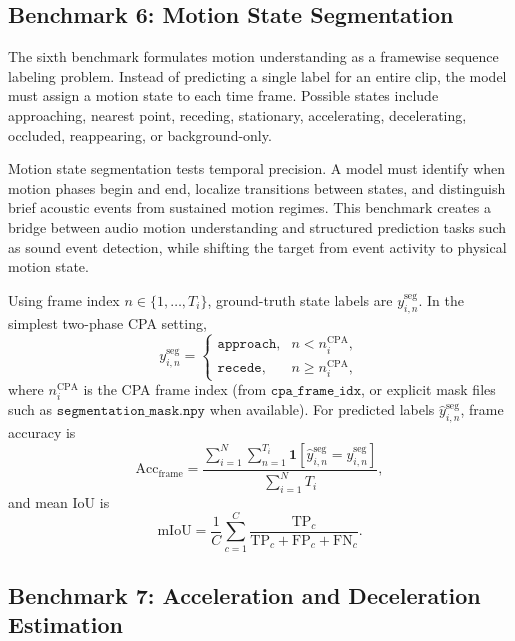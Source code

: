 \documentclass{article}
\begin{document}
\subsection{Benchmark 6: Motion State Segmentation}

The sixth benchmark formulates motion understanding as a framewise sequence labeling problem. Instead of predicting a single label for an entire clip, the model must assign a motion state to each time frame. Possible states include approaching, nearest point, receding, stationary, accelerating, decelerating, occluded, reappearing, or background-only.

Motion state segmentation tests temporal precision. A model must identify when motion phases begin and end, localize transitions between states, and distinguish brief acoustic events from sustained motion regimes. This benchmark creates a bridge between audio motion understanding and structured prediction tasks such as sound event detection, while shifting the target from event activity to physical motion state.

Using frame index \(n\in\{1,\dots,T_i\}\), ground-truth state labels are \(y_{i,n}^{\text{seg}}\). In the simplest two-phase CPA setting,
\begin{equation}
  y_{i,n}^{\text{seg}}=
  \begin{cases}
    \texttt{approach}, & n<n_i^{\mathrm{CPA}},\\
    \texttt{recede}, & n\ge n_i^{\mathrm{CPA}},
  \end{cases}
\end{equation}
where \(n_i^{\mathrm{CPA}}\) is the CPA frame index (from \(\texttt{cpa\_frame\_idx}\), or explicit mask files such as \(\texttt{segmentation\_mask.npy}\) when available). For predicted labels \(\hat y_{i,n}^{\text{seg}}\), frame accuracy is
\begin{equation}
  \mathrm{Acc}_{\text{frame}}=\frac{\sum_{i=1}^{N}\sum_{n=1}^{T_i}\mathbf{1}\!\left[\hat y_{i,n}^{\text{seg}}=y_{i,n}^{\text{seg}}\right]}{\sum_{i=1}^{N}T_i},
\end{equation}
and mean IoU is
\begin{equation}
  \mathrm{mIoU}=\frac{1}{C}\sum_{c=1}^{C}\frac{\mathrm{TP}_c}{\mathrm{TP}_c+\mathrm{FP}_c+\mathrm{FN}_c}.
\end{equation}

\subsection{Benchmark 7: Acceleration and Deceleration Estimation}
\end{document}
